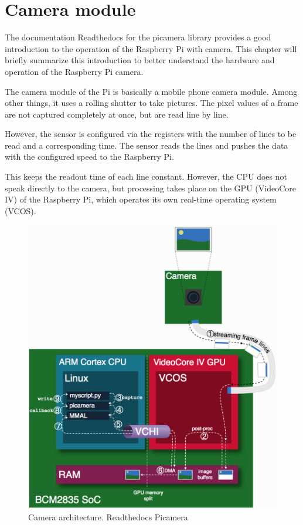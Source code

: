 \documentclass[12pt, a4paper]{report}
\begin{document}
    \section{Camera module}
    The documentation Readthedocs for the picamera library \cite{ReadTheDocsPicamera} provides a good introduction to the operation of the Raspberry Pi with camera. This chapter will briefly summarize this introduction to better understand the hardware and operation of the Raspberry Pi camera.
    
    The camera module of the Pi is basically a mobile phone camera module. Among other things, it uses a rolling shutter to take pictures. The pixel values of a frame are not captured completely at once, but are read line by line.
    
    However, the sensor is configured via the registers with the number of lines to be read and a corresponding time. The sensor reads the lines and pushes the data with the configured speed to the Raspberry Pi.
    
    This keeps the readout time of each line constant. However, the CPU does not speak directly to the camera, but processing takes place on the GPU (VideoCore IV) of the Raspberry Pi, which operates its own real-time operating system (VCOS).
    
    \bigskip
    \noindent
    \begin{figure}[H]
    \centering
    \includegraphics[scale=0.7]{Images/camera_architecture.png}
    
    \caption{Camera architecture. Readthedocs Picamera}
    \end{figure}
    
\end{document}
